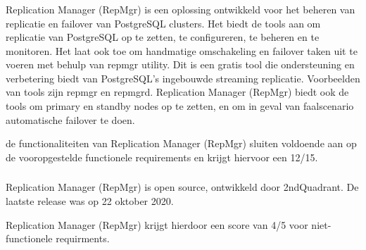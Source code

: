 \subsubsection{}
\label{subsubsec:Functionele Requirements}
Replication Manager (RepMgr) is een oplossing ontwikkeld voor het beheren van replicatie en failover van PostgreSQL clusters. Het biedt de tools aan om replicatie van PostgreSQL op te zetten, te configureren, te beheren en te monitoren. Het laat ook toe om handmatige omschakeling en failover taken uit te voeren met behulp van repmgr utility. Dit is een gratis tool die ondersteuning en verbetering biedt van PostgreSQL's ingebouwde streaming replicatie.
Voorbeelden van tools zijn repmgr en repmgrd.
Replication Manager (RepMgr) biedt ook de tools om primary en standby nodes op te zetten, en om in geval van faalscenario automatische failover te doen.

de functionaliteiten van Replication Manager (RepMgr) sluiten voldoende aan op de vooropgestelde functionele requirements en krijgt hiervoor een 12/15.

\subsubsection{}
\label{subsubsec:Niet-functionele Requirements}
Replication Manager (RepMgr) is open source, ontwikkeld door 2ndQuadrant.
De laatste release was op 22 oktober 2020.

Replication Manager (RepMgr) krijgt hierdoor een score van 4/5 voor niet-functionele requirments.



\subsection{}
\label{subsec:Oplossing 5}

\subsection{}
\label{subsec:Oplossing 6}


\section{}
\label{sec:Resultatenanalyse}

